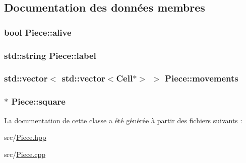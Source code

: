 \subsection{Documentation des données membres}
\hypertarget{class_piece_a8b3c2f812ead74ba513f521e63f767f9}{
\subsubsection[{alive}]{\setlength{\rightskip}{0pt plus 5cm}bool Piece\-::alive\hspace{0.3cm}{\ttfamily [protected]}}}\label{class_piece_a8b3c2f812ead74ba513f521e63f767f9}
\hypertarget{class_piece_aec026f7ca20120f0b635591de2f86662}{
\subsubsection[{label}]{\setlength{\rightskip}{0pt plus 5cm}std\-::string Piece\-::label\hspace{0.3cm}{\ttfamily [protected]}}}\label{class_piece_aec026f7ca20120f0b635591de2f86662}
\hypertarget{class_piece_a022b28159d944243023804a678d7024f}{
\subsubsection[{movements}]{\setlength{\rightskip}{0pt plus 5cm}std\-::vector$<$ std\-::vector$<${\bf Cell}$\ast$$>$ $>$ Piece\-::movements\hspace{0.3cm}{\ttfamily [protected]}}}\label{class_piece_a022b28159d944243023804a678d7024f}
\hypertarget{class_piece_a1e38a3d73f5f7171eca664a77c7aaeff}{
\subsubsection[{square}]{$\ast$ Piece\-::square\hspace{0.3cm}{\ttfamily [protected]}}}\label{class_piece_a1e38a3d73f5f7171eca664a77c7aaeff}


La documentation de cette classe a été générée à partir des fichiers suivants \-:\begin{DoxyCompactItemize}
\item 
src/\hyperlink{_piece_8hpp}{Piece.\-hpp}\item 
src/\hyperlink{_piece_8cpp}{Piece.\-cpp}\end{DoxyCompactItemize}
